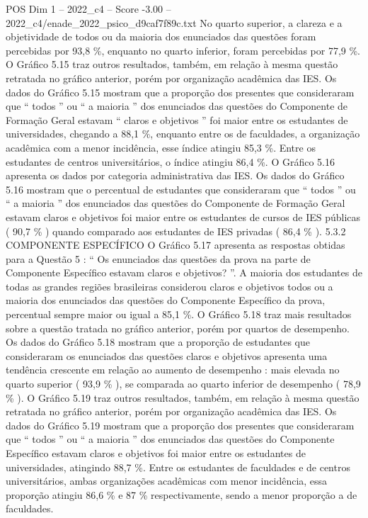 \begin{textsample}{POS Dim 1 – 2022\_c4 – Score -3.00 – 2022\_c4/enade\_2022\_psico\_d9caf7f89c.txt}
No quarto superior, a clareza e a objetividade de todos ou da maioria dos enunciados das questões foram percebidas por 93,8 \%, enquanto no quarto inferior, foram percebidas por 77,9 \%.
O Gráfico 5.15 traz outros resultados, também, em relação à mesma questão retratada no gráfico anterior, porém por organização acadêmica das IES.
Os dados do Gráfico 5.15 mostram que a proporção dos presentes que consideraram que “ todos ” ou “ a maioria ” dos enunciados das questões do Componente de Formação Geral estavam “ claros e objetivos ” foi maior entre os estudantes de universidades, chegando a 88,1 \%, enquanto entre os de faculdades, a organização acadêmica com a menor incidência, esse índice atingiu 85,3 \%.
Entre os estudantes de centros universitários, o índice atingiu 86,4 \%.
O Gráfico 5.16 apresenta os dados por categoria administrativa das IES.
Os dados do Gráfico 5.16 mostram que o percentual de estudantes que consideraram que “ todos ” ou “ a maioria ” dos enunciados das questões do Componente de Formação Geral estavam claros e objetivos foi maior entre os estudantes de cursos de IES públicas ( 90,7 \% ) quando comparado aos estudantes de IES privadas ( 86,4 \% ). 5.3.2 COMPONENTE ESPECÍFICO O Gráfico 5.17 apresenta as respostas obtidas para a Questão 5 : “ Os enunciados das questões da prova na parte de Componente Específico estavam claros e objetivos? ”.
A maioria dos estudantes de todas as grandes regiões brasileiras considerou claros e objetivos todos ou a maioria dos enunciados das questões do Componente Específico da prova, percentual sempre maior ou igual a 85,1 \%.
O Gráfico 5.18 traz mais resultados sobre a questão tratada no gráfico anterior, porém por quartos de desempenho.
Os dados do Gráfico 5.18 mostram que a proporção de estudantes que consideraram os enunciados das questões claros e objetivos apresenta uma tendência crescente em relação ao aumento de desempenho : mais elevada no quarto superior ( 93,9 \% ), se comparada ao quarto inferior de desempenho ( 78,9 \% ).
O Gráfico 5.19 traz outros resultados, também, em relação à mesma questão retratada no gráfico anterior, porém por organização acadêmica das IES.
Os dados do Gráfico 5.19 mostram que a proporção dos presentes que consideraram que “ todos ” ou “ a maioria ” dos enunciados das questões do Componente Específico estavam claros e objetivos foi maior entre os estudantes de universidades, atingindo 88,7 \%.
Entre os estudantes de faculdades e de centros universitários, ambas organizações acadêmicas com menor incidência, essa proporção atingiu 86,6 \% e 87 \% respectivamente, sendo a menor proporção a de faculdades.

\end{textsample}
